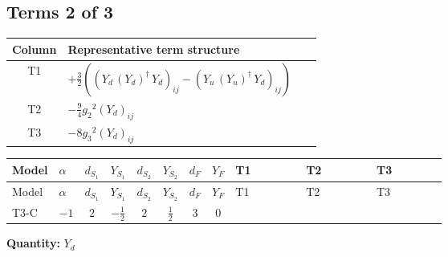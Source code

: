 \documentclass[8pt]{article}
\begin{document}
\begin{landscape}
\subsection*{Terms 2 of 3}
\begin{center}
\begin{tabular}{@{}c >{\raggedright\arraybackslash}p{0.82\linewidth}@{}}
\toprule
Column & Representative term structure \\
\midrule
T1 & \(\displaystyle +\frac{3}{2} (\left({Y_d}\,\left({Y_d}\right)^{\dagger}\,{Y_d}\right)_{ij}-\left({Y_u}\,\left({Y_u}\right)^{\dagger}\,{Y_d}\right)_{ij})\) \\
\midrule
T2 & \(\displaystyle -\frac{9}{4} {g_2}^2 \left({Y_d}\right)_{ij}\) \\
\midrule
T3 & \(\displaystyle -8 {g_3}^2 \left({Y_d}\right)_{ij}\) \\
\midrule
\bottomrule
\end{tabular}
\end{center}
\smallskip
\tiny
\begin{longtable}{@{}llcccccc >{\raggedright\arraybackslash}p{0.21\linewidth} >{\raggedright\arraybackslash}p{0.21\linewidth} >{\raggedright\arraybackslash}p{0.21\linewidth}@{}}
\toprule
Model & $\alpha$ & $d_{S_1}$ & $Y_{S_1}$ & $d_{S_2}$ & $Y_{S_2}$ & $d_F$ & $Y_F$ & T1 & T2 & T3 \\
\midrule
\endfirsthead
\toprule
Model & $\alpha$ & $d_{S_1}$ & $Y_{S_1}$ & $d_{S_2}$ & $Y_{S_2}$ & $d_F$ & $Y_F$ & T1 & T2 & T3 \\
\midrule
\endhead
T3-C & $-1$ & $2$ & $-\frac{1}{2}$ & $2$ & $\frac{1}{2}$ & $3$ & $0$ & \scriptsize\adjustbox{max width=\linewidth}{$\begin{gathered} +\frac{3}{2} (\left({Y_d}\,\left({Y_d}\right)^{\dagger}\,{Y_d}\right)_{ij}-\left({Y_u}\,\left({Y_u}\right)^{\dagger}\,{Y_d}\right)_{ij})\end{gathered}$} & \scriptsize\adjustbox{max width=\linewidth}{$\begin{gathered} -\frac{9}{4} {g_2}^2 \left({Y_d}\right)_{ij}\end{gathered}$} & \scriptsize\adjustbox{max width=\linewidth}{$\begin{gathered} -8 {g_3}^2 \left({Y_d}\right)_{ij}\end{gathered}$} \\
\midrule
\bottomrule
\end{longtable}
\clearpage
\noindent\textbf{Quantity: }$Y_d$\par\smallskip

\end{landscape}
\end{document}

